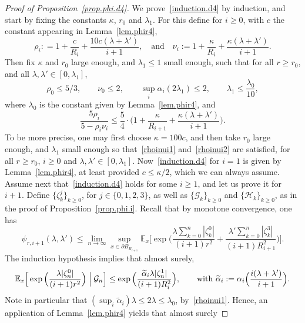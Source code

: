 \begin{proof}[Proof of Proposition~\ref{prop.phi.d4}]
We prove~\eqref{induction.d4} by induction, and start by fixing the constants $\kappa$, $r_0$ and $\lambda_1$. For this define for $i\ge 0$, with $c$ the constant appearing in Lemma~\ref{lem.phir4},
\[
\rho_i : = 1+\frac{c}{R_i} + \frac{10c(\lambda + \lambda')}{i+1},\quad \text{and}\quad \nu_i:= 1+\frac{\kappa }{R_i} + \frac{\kappa(\lambda + \lambda')}{i+1}.
\]
Then fix $\kappa$ and $r_0$ large enough, and $\lambda_1\le 1$ small enough, such that for all $r\ge r_0$, and all $\lambda, \lambda'\in[0,\lambda_1]$,
\begin{equation}\label{rhoinui1}
\rho_0 \le 5/3, \qquad \nu_0\le 2, \qquad \sup_i \alpha_i(2\lambda_1)\le 2, \qquad \lambda_1\le \frac{\lambda_0}{10},
\end{equation}
where $\lambda_0$ is the constant given by Lemma~\ref{lem.phir4}, and
\begin{equation}\label{rhoinui2}
\frac{5\rho_i}{5-\rho_i\nu_i} \le \frac{5}{4}\cdot \Big(1+\frac{\kappa }{R_{i+1}} + \frac{\kappa(\lambda+\lambda')}{i+1}\Big).
\end{equation}
To be more precise, one may first choose $\kappa=100c$, and then take $r_0$ large enough, and $\lambda_1$ small enough
so that~\eqref{rhoinui1} and~\eqref{rhoinui2} are satisfied, for all $r\ge r_0$, $i\ge 0$ and $\lambda, \lambda'\in[0,\lambda_1]$.
Now~\eqref{induction.d4} for $i=1$ is given by Lemma~\ref{lem.phir4}, at least provided
$c\le \kappa/2$, which we can always assume.
Assume next that~\eqref{induction.d4} holds for some $i\ge 1$, and let us prove it for $i+1$. Define $\{\zeta_k^j\}_{k\ge 0}$, for $j\in \{0,1,2,3\}$,
as well as $\{\mathcal G_k\}_{k\ge 0}$ and $\{\mathcal H_k\}_{k\ge 0}$, as in the proof of Proposition~\ref{prop.phi.i}.
Recall that by monotone convergence, one has
\begin{equation*}%
\psi_{r,i+1}(\lambda,\lambda') \le \lim_{n \to \infty} \sup_{x\in \partial B_{R_{i+1}}}
\mathbb E_x\Big[\exp\Big(\frac{\lambda\sum_{k=0}^n |\zeta_k^0|}{(i+1)r^2}+\frac{\lambda'\sum_{k=0}^n |\zeta^3_k|}{(i+1)R_{i+1}^2}\Big)\Big].
\end{equation*}
The induction hypothesis implies that almost surely,
\[
\mathbb E_x\Big[\exp\Big(\frac{\lambda |\zeta_n^0|}{(i+1)r^2}\Big) \Bigm|\mathcal G_n \Big] \le
\exp\Big(\frac{\widetilde \alpha_i \lambda|\zeta_n^1|}{(i+1)R_i^2}\Big),\qquad \text{with }\widetilde \alpha_i: = \alpha_i\Big(\frac{i(\lambda+\lambda')}{i+1}\Big).
\]
Note in particular that $(\sup_i \widetilde \alpha_i)\lambda \le 2\lambda \le \lambda_0$, by~\eqref{rhoinui1}. Hence, an application of Lemma~\ref{lem.phir4} yields that almost surely

\end{proof}
